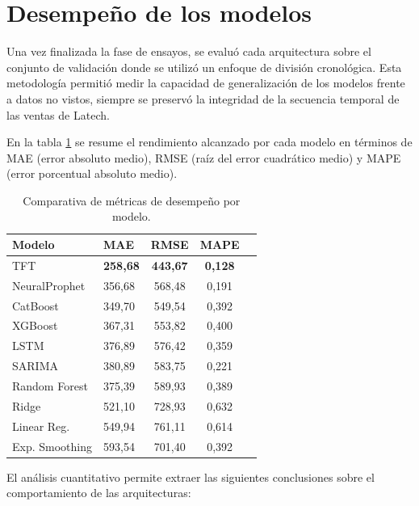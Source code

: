 \section{Desempeño de los modelos}

Una vez finalizada la fase de ensayos, se evaluó cada arquitectura sobre el conjunto de validación donde se utilizó un enfoque de división cronológica. Esta metodología permitió medir la capacidad de generalización de los modelos frente a datos no vistos, siempre se preservó la integridad de la secuencia temporal de las ventas de Latech.

En la tabla \ref{tab:metricas_modelos} se resume el rendimiento alcanzado por cada modelo en términos de MAE (error absoluto medio), RMSE (raíz del error cuadrático medio) y MAPE (error porcentual absoluto medio).


\begin{table}[h]
    \centering
    \caption{Comparativa de métricas de desempeño por modelo.}
    \label{tab:metricas_modelos}
    \begin{tabular}{l l c c c}
        \toprule
        \textbf{Modelo} & \textbf{MAE} & \textbf{RMSE} & \textbf{MAPE} \\
        \midrule
        TFT & \textbf{258,68} & \textbf{443,67} & \textbf{0,128} \\
        NeuralProphet & 356,68 & 568,48 & 0,191 \\
        CatBoost & 349,70 & 549,54 & 0,392 \\
        XGBoost & 367,31 & 553,82 & 0,400 \\
        LSTM & 376,89 & 576,42 & 0,359 \\
        SARIMA & 380,89 & 583,75 & 0,221 \\
        Random Forest & 375,39 & 589,93 & 0,389 \\
        Ridge & 521,10 & 728,93 & 0,632 \\
        Linear Reg. & 549,94 & 761,11 & 0,614 \\
        Exp. Smoothing & 593,54 & 701,40 & 0,392 \\
        \bottomrule
    \end{tabular}
\end{table}


El análisis cuantitativo permite extraer las siguientes conclusiones sobre el comportamiento de las arquitecturas:

